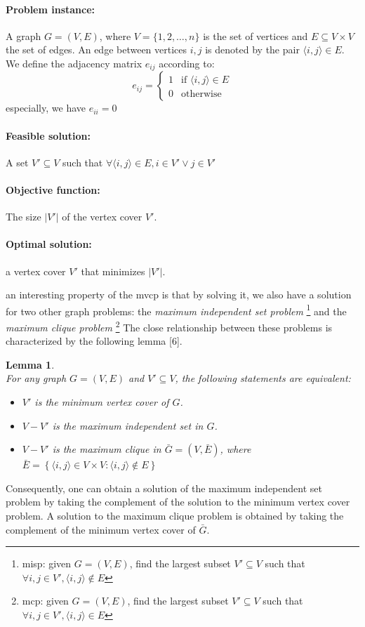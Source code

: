 \documentclass[12pt]{article}
\newtheorem{lemma}{Lemma}
\begin{document}
{
\setlength{\parskip}{0em}
\paragraph{Problem instance:}
A graph $G = (V, E)$, where $V = \{1, 2, \dots, n\}$
is the set of vertices and $E \subseteq V \times V$ the
set of edges. An edge between vertices $i, j$ is denoted
by the pair $\langle i, j \rangle \in E$. We define the adjacency
matrix $e_{ij}$ according to:
\[
e_{ij} =
\begin{cases}
1 & \text{if } \langle i, j \rangle \in E \\
0 & \text{otherwise}
\end{cases}
\]
especially, we have $e_{ii} = 0$

\paragraph{Feasible solution:} A set $V' \subseteq V$ such that
$\forall \langle i, j \rangle \in E, i \in V' \vee j \in V'$
\paragraph{Objective function:} The size $|V'|$ of the vertex cover $V'$.
\paragraph{Optimal solution:} a vertex cover $V'$ that minimizes $|V'|$.
}

an interesting property of the mvcp is that by
solving it, we also have a solution for two other
graph problems: the \textit{maximum independent set problem}%
\footnote{%
misp: given $G = (V, E)$, find the largest subset $V' \subseteq V$
such that $\forall i, j \in V', \langle i, j \rangle \notin E$
}
and the \textit{maximum clique problem}%
\footnote{%
mcp: given $G = (V, E)$, find the largest subset $V' \subseteq V$
such that $\forall i, j \in V', \langle i, j \rangle \in E$
}
The close relationship between these problems
is characterized by the following lemma [6].

\begin{lemma}
\ \\[3mm]
For any graph $G = (V, E)$ and $V' \subseteq V$, the following
statements are equivalent:
\begin{itemize}
\vspace{-3mm}
\setlength{\parskip}{0.5em}
\item $V'$ is the minimum vertex cover of $G$.
\item $V - V'$ is the maximum independent set in $G$.
\item $V - V'$ is the maximum clique in $\bar{G} = (V, \bar{E})$, where \\
$\bar{E}=\left\{ \langle i, j \rangle\in V \times V :
\langle i, j \rangle \notin E \right\}$
\end{itemize}
\end{lemma}
Consequently, one can obtain a solution of the maximum independent set
problem by taking the complement of the solution to the minimum vertex cover
problem. A solution to the maximum clique problem is obtained by
taking the complement of the minimum vertex cover of $\bar{G}$.
\end{document}

